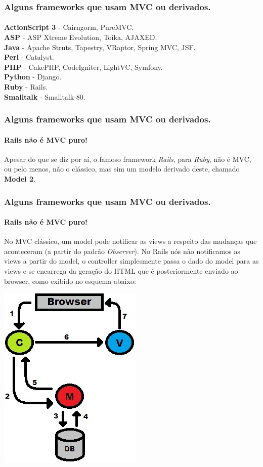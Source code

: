 \documentclass{beamer}
\begin{document}
\begin{frame}
\frametitle{Alguns frameworks que usam MVC ou derivados.}
\framesubtitle{}
	\textbf{ActionScript 3} - Cairngorm, PureMVC.\\
	\textbf{ASP} - ASP Xtreme Evolution, Toika, AJAXED.\\
	\textbf{Java} - Apache Struts, Tapestry, VRaptor, Spring MVC, JSF.\\
	\textbf{Perl} - Catalyst.\\
	\textbf{PHP} - CakePHP, CodeIgniter, LightVC, Symfony.\\
	\textbf{Python} - Django.\\
	\textbf{Ruby} - Rails.\\
	\textbf{Smalltalk} - Smalltalk-80.\\
\end{frame}

\begin{frame}
\frametitle{Alguns frameworks que usam MVC ou derivados.}
\framesubtitle{Rails não é MVC puro!}
	Apesar do que se diz por aí, o famoso framework \textit{Rails}, para \textit{Ruby}, não é MVC, ou pelo menos, não o clássico, 
	mas sim um modelo derivado deste, chamado \textbf{Model 2}.
\end{frame}

\begin{frame}
\frametitle{Alguns frameworks que usam MVC ou derivados.}
\framesubtitle{Rails não é MVC puro!}
	No MVC clássico, um model pode notificar as views a respeito das mudanças que aconteceram (a partir do padrão \textit{Observer}). No Rails
	nós não notificamos as views a partir do model, o controller simplesmente passa o dado do model para as views e se encarrega da geração do HTML que 
	é posteriormente enviado ao browser, como exibido no esquema abaixo:
	\begin{center}
		\includegraphics[scale=0.35]{RailsMVC.jpg}
	\end{center} 
\end{frame}
\end{document}
